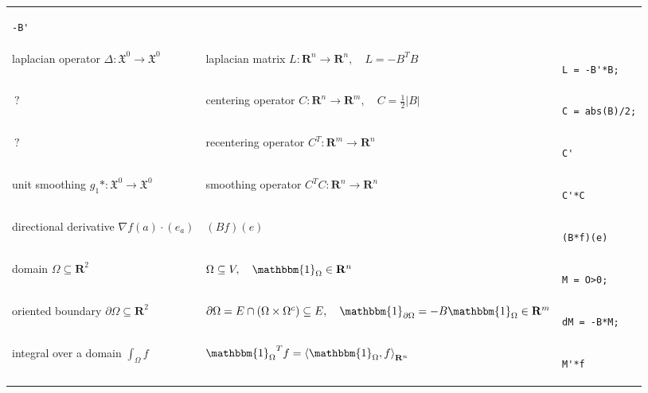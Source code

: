\documentclass{article}
\def\R{\mathbf{R}}
\begin{document}
\begin{tabular}{l|l|b{}}
\begin{verbatim}
-B'
\end{verbatim}
\\
laplacian operator $\Delta:\mathfrak{X}^0\to\mathfrak{X}^0$ &
laplacian matrix $L:\R^n\to\R^n,\quad L=-B^TB$ &
\begin{verbatim}
L = -B'*B;
\end{verbatim}
\\
$\ ?$ &
	centering operator $C:\R^n\to\R^m,\quad C=\frac{1}{2}|B|$ &
\begin{verbatim}
C = abs(B)/2;
\end{verbatim}
\\
$\ ?$ &
recentering operator $C^T:\R^m\to\R^n$ &
\begin{verbatim}
C'
\end{verbatim}
\\
unit smoothing $g_1*:\mathfrak{X}^0\to\mathfrak{X}^0$ &
smoothing operator $C^TC:\R^n\to\R^n$ &
\begin{verbatim}
C'*C
\end{verbatim}
\\
directional derivative $\nabla f(a)\cdot(e_a)$ &
$(Bf)(e)$ &
\begin{verbatim}
(B*f)(e)
\end{verbatim}
\\
domain $\Omega\subseteq\R^2$ & $\Omega\subseteq V,\quad\mathbbm{1}_\Omega\in\R^n$ &
\begin{verbatim}
M = O>0;
\end{verbatim}
\\
oriented boundary $\partial\Omega\subseteq\R^2$ & $\partial\Omega=E\cap(\Omega\times\Omega^c)\subseteq E,\quad \mathbbm{1}_{\partial\Omega}=-B\mathbbm{1}_\Omega\in\R^m$ &
\begin{verbatim}
dM = -B*M;
\end{verbatim}
\\
integral over a domain $\int_\Omega f$ &
${\mathbbm{1}_\Omega}^T f = \left\langle\mathbbm{1}_\Omega,f\right\rangle_{\R^n}$ &
\begin{verbatim}
M'*f
\end{verbatim}
\\

\end{tabular}
\end{document}
